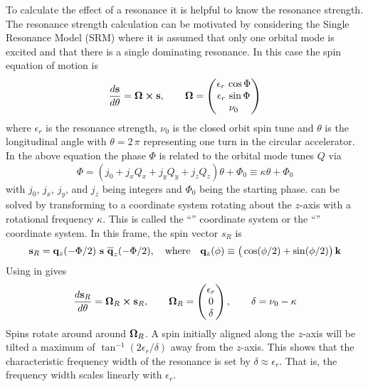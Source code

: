 To calculate the effect of a resonance it is helpful to know the resonance strength.  The resonance
strength calculation can be motivated by considering the Single Resonance Model
(SRM)\cite{b:spin.hoff} where it is assumed that only one orbital mode is excited and that there is
a single dominating resonance. In this case the spin equation of motion is
\begin{equation}
  \frac{d {\bf s}}{d \theta} = {\bf \Omega} \mathbin{\boldsymbol{\times}} {\bf s}, \qquad 
  {\bf \Omega} = \begin{pmatrix}
    \epsilon_r \, \cos \Phi \\
    \epsilon_r \, \sin \Phi \\
    \nu_0
  \end{pmatrix}
  \label{stos}
\end{equation}
where $\epsilon_r$ is the resonance strength, $\nu_0$ is the closed orbit spin tune and $\theta$ is
the longitudinal angle with $\theta = 2 \, \pi$ representing one turn in the circular accelerator.
In the above equation the phase $\Phi$ is related to the orbital mode tunes $Q$ via
\begin{equation}
  \Phi = (j_0 + j_x Q_x + j_y Q_y + j_z Q_z) \theta + \Phi_0 \equiv
  \kappa \theta + \Phi_0
\end{equation}
with $j_0$, $j_x$, $j_y$, and $j_z$ being integers and $\Phi_0$ being the starting phase. 
can be solved by transforming to a coordinate system rotating about the $z$-axis with a rotational
frequency $\kappa$. This is called the ``'' coordinate system or the ``''
coordinate system. In this frame, the spin vector $s_R$ is
\begin{equation}
  \bfs_R = \bfq_z(-\Phi/2) \,\, \bfs \,\, \BAR\bfq_z(-\Phi/2), \quad \text{where} \quad
  \bfq_z(\phi) \equiv \big( \cos (\phi/2) +  \sin (\phi/2) \big) \, \calk
  \label{rqsq}
\end{equation}
Using  in  gives
\begin{equation}
  \frac{d {\bf s}_R}{d \theta} = {\bf \Omega}_R \mathbin{\boldsymbol{\times}} {\bf s}_R, \qquad
  {\bf \Omega}_R = \begin{pmatrix}
    \epsilon_r \\
    0 \\
    \delta 
  \end{pmatrix},
  \qquad
  \delta = \nu_0 - \kappa
  \label{stos2}
\end{equation}
Spins rotate around around ${\bf \Omega}_R$. A spin initially aligned along the $z$-axis will be 
tilted a maximum of $\tan^{-1}(2\epsilon_r/\delta)$ away from the $z$-axis. This shows that the
characteristic frequency width of the resonance is set by $\delta \approx \epsilon_r$. That is,
the frequency width scales linearly with $\epsilon_r$.

